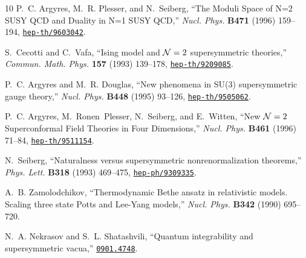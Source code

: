 \begin{thebibliography}{10}
P.~C. Argyres, M.~R. Plesser, and N.~Seiberg, ``{The Moduli Space of N=2 SUSY
  {QCD} and Duality in N=1 SUSY {QCD}},'' {\em Nucl. Phys.} {\bf B471} (1996)
  159--194,
\href{http://www.arXiv.org/abs/hep-th/9603042}{{\tt hep-th/9603042}}.

S.~Cecotti and C.~Vafa, ``Ising model and {$\mathcal{N}=2$} supersymmetric theories,''
  {\em Commun. Math. Phys.} {\bf 157} (1993) 139--178,
\href{http://www.arXiv.org/abs/hep-th/9209085}{{\tt hep-th/9209085}}.

P.~C. Argyres and M.~R. Douglas, ``New phenomena in {SU(3)} supersymmetric
  gauge theory,'' {\em Nucl. Phys.} {\bf B448} (1995) 93--126,
\href{http://www.arXiv.org/abs/hep-th/9505062}{{\tt hep-th/9505062}}.

P.~C. Argyres, M.~Ronen~Plesser, N.~Seiberg, and E.~Witten, ``{New {$\mathcal{N}=2$}
  Superconformal Field Theories in Four Dimensions},'' {\em Nucl. Phys.} {\bf
  B461} (1996) 71--84,
\href{http://www.arXiv.org/abs/hep-th/9511154}{{\tt hep-th/9511154}}.

N.~Seiberg, ``{Naturalness versus supersymmetric nonrenormalization
  theorems},'' {\em Phys. Lett.} {\bf B318} (1993) 469--475,
\href{http://www.arXiv.org/abs/hep-ph/9309335}{{\tt hep-ph/9309335}}.

A.~B. Zamolodchikov, ``{Thermodynamic Bethe ansatz in relativistic models.
  Scaling three state Potts and Lee-Yang models},'' {\em Nucl. Phys.} {\bf
  B342} (1990)
695--720.

N.~A. Nekrasov and S.~L. Shatashvili, ``{Quantum integrability and
  supersymmetric vacua},''
\href{http://www.arXiv.org/abs/0901.4748}{{\tt 0901.4748}}.

\end{thebibliography}
